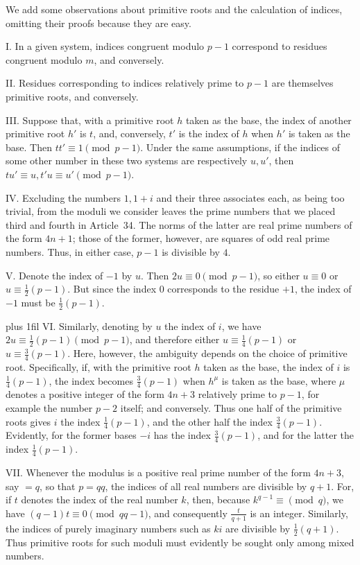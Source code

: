 We add some observations about primitive roots and the calculation of indices, omitting their proofs because they are easy.

I. In a given system, indices congruent modulo $p-1$ correspond to residues congruent modulo $m$, and conversely.

II. Residues corresponding to indices relatively prime to $p-1$ are themselves primitive roots, and conversely.

III. Suppose that, with a primitive root $h$ taken as the base, the index of another primitive root $h'$ is $t$, and, conversely, $t'$ is the index of $h$ when $h'$ is taken as the base. Then $tt'\equiv1\pmod{p-1}$. Under the same assumptions, if the indices of some other number in these two systems are respectively $u,u'$, then $tu'\equiv u,t'u\equiv u'\pmod{p-1}$.

IV. Excluding the numbers $1,1+i$ and their three associates each, as being too trivial, from the moduli we consider leaves the prime numbers that we placed third and fourth in Article~34. The norms of the latter are real prime numbers of the form $4n+1$; those of the former, however, are squares of odd real prime numbers. Thus, in either case, $p-1$ is divisible by $4$.

V. Denote the index of $-1$ by $u$. Then $2u\equiv0\pmod{p-1}$, so either $u\equiv0$ or $u\equiv\frac12(p-1)$. But since the index $0$ corresponds to the residue $+1$, the index of $-1$ must be $\frac12(p-1)$.

\begingroup\rightskip=0pt plus 1fil\relax
VI. Similarly, denoting by $u$ the index of $i$, we have \mbox{$2u\equiv\frac12(p-1)\pmod{p-1}$}, and therefore either $u\equiv\frac14(p-1)$ or $u\equiv\frac34(p-1)$. Here, however, the ambiguity depends on the choice of primitive root. Specifically, if, with the primitive root $h$ taken as the base,
%
the index of $i$ is $\frac14(p-1)$, the index becomes $\frac34(p-1)$ when $h^\mu$ is taken as the base, where $\mu$ denotes a positive integer of the form $4n+3$ relatively prime to $p-1$, for example the number $p-2$ itself; and conversely. Thus one half of the primitive roots gives $i$ the index $\frac14(p-1)$, and the other half the index $\frac34(p-1)$. Evidently, for the former bases $-i$ has the index $\frac34(p-1)$, and for the latter the index $\frac14(p-1)$.
\par\endgroup
VII. Whenever the modulus is a positive real prime number of the form $4n+3$, say $=q$, so that $p=qq$, the indices of all real numbers are divisible by $q+1$. For, if $t$ denotes the index of the real number $k$, then, because $k^{q-1}\equiv\pmod q$, we have $(q-1)t\equiv0\pmod{qq-1}$, and consequently $\frac{t}{q+1}$ is an integer. Similarly, the indices of purely imaginary numbers such as $ki$ are divisible by $\frac12(q+1)$. Thus primitive roots for such moduli must evidently be sought only among mixed numbers.

